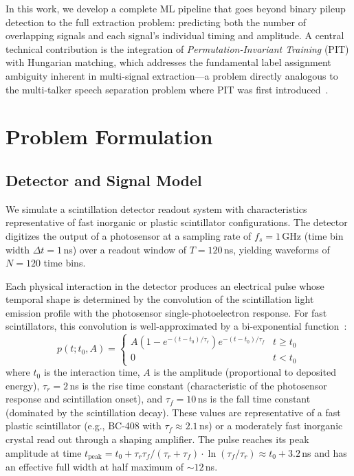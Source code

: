 \documentclass[11pt,twocolumn]{article}
\begin{document}
In this work, we develop a complete ML pipeline that goes beyond binary pileup detection to the full extraction problem: predicting both the number of overlapping signals and each signal's individual timing and amplitude.
A central technical contribution is the integration of \emph{Permutation-Invariant Training} (PIT) with Hungarian matching, which addresses the fundamental label assignment ambiguity inherent in multi-signal extraction---a problem directly analogous to the multi-talker speech separation problem where PIT was first introduced~\cite{yu2017pit}.

\section{Problem Formulation}
\label{sec:problem}

\subsection{Detector and Signal Model}

We simulate a scintillation detector readout system with characteristics representative of fast inorganic or plastic scintillator configurations.
The detector digitizes the output of a photosensor at a sampling rate of $f_s = 1$\,GHz (time bin width $\Delta t = 1$\,ns) over a readout window of $T = 120$\,ns, yielding waveforms of $N = 120$ time bins.

Each physical interaction in the detector produces an electrical pulse whose temporal shape is determined by the convolution of the scintillation light emission profile with the photosensor single-photoelectron response.
For fast scintillators, this convolution is well-approximated by a bi-exponential function~\cite{knoll2010radiation,spieler2005semiconductor}:
\begin{equation}
    p(t; t_0, A) = \begin{cases}
        A\left(1 - e^{-(t-t_0)/\tau_r}\right) e^{-(t-t_0)/\tau_f} & t \geq t_0 \\
        0 & t < t_0
    \end{cases}
    \label{eq:pulse}
\end{equation}
where $t_0$ is the interaction time, $A$ is the amplitude (proportional to deposited energy), $\tau_r = 2$\,ns is the rise time constant (characteristic of the photosensor response and scintillation onset), and $\tau_f = 10$\,ns is the fall time constant (dominated by the scintillation decay).
These values are representative of a fast plastic scintillator (e.g., BC-408 with $\tau_f \approx 2.1$\,ns) or a moderately fast inorganic crystal read out through a shaping amplifier.
The pulse reaches its peak amplitude at time $t_{\text{peak}} = t_0 + \tau_r \tau_f / (\tau_r + \tau_f) \cdot \ln(\tau_f/\tau_r) \approx t_0 + 3.2$\,ns and has an effective full width at half maximum of ${\sim}12$\,ns.
\end{document}
